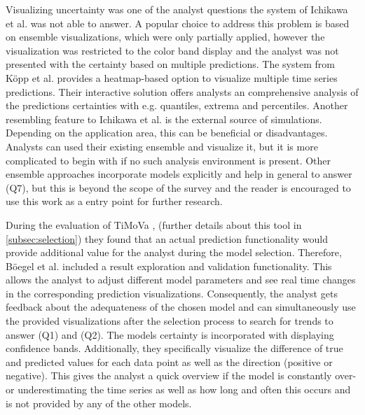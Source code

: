 \documentclass[electronic]{vgtc}             %
\begin{document}
Visualizing uncertainty was one of the analyst questions the system of Ichikawa et al. \cite{ichikawa:2002} was not able to answer.
A popular choice to address this problem is based on ensemble visualizations, which were only partially applied, however the visualization was restricted to the color band display and the analyst was not presented with the certainty based on multiple predictions. 
The system from K\"opp et al. \cite{koepp:2014} provides a heatmap-based option to visualize multiple time series predictions. 
Their interactive solution offers analysts an comprehensive analysis of the predictions certainties with e.g. quantiles, extrema and percentiles. 
Another resembling feature to Ichikawa et al. \cite{ichikawa:2002} is the external source of simulations. 
Depending on the application area, this can be beneficial or disadvantages. 
Analysts can used their existing ensemble and visualize it, but it is more complicated to begin with if no such analysis environment is present. 
Other ensemble approaches incorporate models explicitly and help in general to answer (Q7), but this is beyond the scope of the survey and the reader is encouraged to use this work as a entry point for further research. 

During the evaluation of TiMoVa \cite{boegl:2013}, (further details about this tool in \autoref{subsec:selection}) they found that an actual prediction functionality would provide additional value for the analyst during the model selection.
Therefore, B\"oegel et al. \cite{boegl:2014} included a result exploration and validation functionality.
This allows the analyst to adjust different model parameters and see real time changes in the corresponding prediction visualizations.
Consequently, the analyst gets feedback about the adequateness of the chosen model and can simultaneously use the provided visualizations after the selection process to search for trends to answer (Q1) and (Q2).
The models certainty is incorporated with displaying confidence bands.
Additionally, they specifically visualize the difference of true and predicted values for each data point as well as the direction (positive or negative).
This gives the analyst a quick overview if the model is constantly over- or underestimating the time series as well as how long and often this occurs and is not provided by any of the other models.
\end{document}
